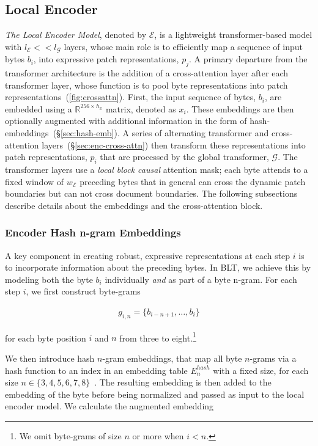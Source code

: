 \subsection{Local Encoder}
\label{section:local}

\textit{The Local Encoder Model}, denoted by $\mathcal{E}$, is a lightweight transformer-based model with $l_{\mathcal{E}} << l_{\mathcal{G}}$ layers, whose main role is to efficiently map a sequence of input bytes $b_i$, into expressive patch representations, $p_j$. A primary departure from the transformer architecture is the addition of a cross-attention layer after each transformer layer, whose function is to pool byte representations into patch representations~(\autoref{fig:crossattn}).
First, the input sequence of bytes, $b_i$, are embedded using a $\mathbb{R}^{256 \times h_{\mathcal{E}}}$ matrix, denoted as $x_i$. These embeddings are then optionally augmented with additional information in the form of hash-embeddings~(\S\ref{sec:hash-emb}).
A series of alternating transformer and cross-attention layers~(\S\ref{sec:enc-cross-attn}) then transform these representations into patch representations, $p_i$ that are processed by the global transformer, $\mathcal{G}$.
The transformer layers use a \textit{local block causal} attention mask; each byte attends to a fixed window of $w_{\mathcal{E}}$ preceding bytes that in general can cross the dynamic patch boundaries but can not cross document boundaries. The following subsections describe details about the embeddings and the cross-attention block.

\subsubsection{Encoder Hash n-gram Embeddings}
\label{sec:ngram-emb}
\label{sec:hash-emb}
A key component in creating robust, expressive representations at each step $i$ is to incorporate information about the preceding bytes. In {\textsc BLT}, we achieve this by modeling both the byte $b_i$ individually \textit{and} as part of a byte n-gram. For each step $i$, we first construct byte-grams

\begin{align}
    g_{i,n}=\{b_{i-n + 1},\ldots, b_i\}
\end{align}

for each byte position $i$ and $n$ from three to eight.\footnote{
We omit byte-grams of size $n$ or more when $i<n$. }

We then introduce hash $n$-gram embeddings, that map all byte $n$-grams via a hash function to an index in an embedding table $E_{n}^{hash}$ with a fixed size, for each size $n \in\{3,4,5,6,7,8\}$~\citep{bai2010learning}.
The resulting embedding is then added to the embedding of the byte before being normalized and passed as input to the local encoder model. We calculate the augmented embedding

